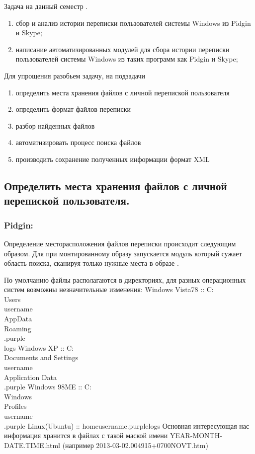 Задача на данный семестр . 

\begin{enumerate}
\item сбор и анализ истории переписки пользователей системы Windows из Pidgin и Skype;
\item написание автоматизированных модулей для сбора истории переписки пользователей системы Windows из таких программ как Pidgin и Skype;
\end{enumerate}

Для упрощения разобьем задачу, на подзадачи
\begin{enumerate}
\item определить места хранения файлов с личной перепиской пользователя
\item определить формат файлов переписки
\item разбор найденных файлов
\item автоматизировать процесс поиска файлов
\item производить сохранение полученных информации формат XML
\end{enumerate}

\subsection{Определить места хранения файлов с личной перепиской пользователя.}

\subsubsection{Pidgin:}
Определение месторасположения файлов переписки происходит следующим образом. Для при монтированному образу запускается модуль который сужает область поиска, сканируя только нужные места в образе . 

По умолчанию файлы располагаются в директориях, для разных операционных систем возможны незначительные изменения: 
Windows Vista\/7\/8 :: C:\\Users\\username\\AppData\\Roaming\\.purple\\logs
Windows XP 		:: C:\\Documents and Settings\\username\\Application Data\\.purple
Windows 98\/ME 	:: C:\\Windows\\Profiles\\username\\.purple
Linux(Ubuntu) 	:: \/home\/username\/.purple\/logs
Основная интересующая нас информация хранится в файлах с такой маской имени YEAR-MONTH-DATE.TIME.html (например 2013-03-02.004915+0700NOVT.htm)\\

